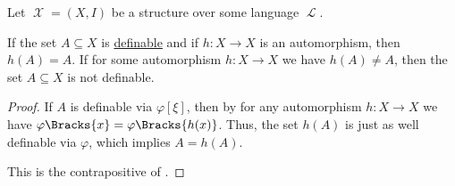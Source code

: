 \begin{corollary}\label{thm:automorphism_of_definable_set}
  Let \( \mscrX = (X, I) \) be a structure over some language \( \mscrL \).

  \begin{thmenum}
     If the set \( A \subseteq X \) is \hyperref[def:first_order_definability]{definable} and if \( h: X \to X \) is an automorphism, then \( h(A) = A \).
     If for some automorphism \( h: X \to X \) we have \( h(A) \neq A \), then the set \( A \subseteq X \) is not definable.
  \end{thmenum}
\end{corollary}
\begin{proof}
   If \( A \) is definable via \( \varphi[\xi] \), then by  for any automorphism \( h: X \to X \) we have \( \varphi\Bracks{x} = \varphi\Bracks{h(x)} \). Thus, the set \( h(A) \) is just as well definable via \( \varphi \), which implies \( A = h(A) \).

   This is the contrapositive of .
\end{proof}
